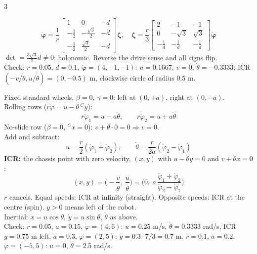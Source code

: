 \begin{multicols}{3}
\begin{fbx}
\[\dot{\boldsymbol\varphi}=\frac1r\begin{bmatrix}1&0&-d\\-\tfrac12&-\tfrac{\sqrt3}2&-d\\-\tfrac12&\tfrac{\sqrt3}2&-d\end{bmatrix}\boldsymbol\zeta,\quad\boldsymbol\zeta=\frac r3\begin{bmatrix}2&-1&-1\\0&-\sqrt3&\sqrt3\\-\tfrac1d&-\tfrac1d&-\tfrac1d\end{bmatrix}\dot{\boldsymbol\varphi}\]
$\det=\tfrac{3\sqrt3}2d\ne0$: holonomic. Reverse the drive sense and all signs flip.\\
Check: $r=0.05$, $d=0.1$, $\dot{\boldsymbol\varphi}=(4,-1,-1)$: $u=0.1667$, $v=0$, $\dot\theta=-0.3333$; ICR $(-v/\dot\theta,u/\dot\theta)=(0,-0.5)$ m, clockwise circle of radius 0.5 m. \chk
\end{fbx}

\begin{fbx}
Fixed standard wheels, $\beta=0$, $\gamma=0$: left at $(0,+a)$, right at $(0,-a)$.\\
Rolling rows ($r\dot\varphi=u-\dot\theta\,{}^Cy$):
\[r\dot\varphi_1=u-a\dot\theta,\qquad r\dot\varphi_2=u+a\dot\theta\]
No-slide row ($\beta=0$, ${}^Cx=0$): $v+\dot\theta\cdot0=0\Rightarrow v=0$.\\
Add and subtract:
\[u=\frac r2(\dot\varphi_1+\dot\varphi_2),\qquad\dot\theta=\frac r{2a}(\dot\varphi_2-\dot\varphi_1)\]
\textbf{ICR:} the chassis point with zero velocity, $(x,y)$ with $u-\dot\theta y=0$ and $v+\dot\theta x=0$:
\[(x,y)=\Big(-\frac v{\dot\theta},\ \frac u{\dot\theta}\Big)=\Big(0,\ a\,\frac{\dot\varphi_1+\dot\varphi_2}{\dot\varphi_2-\dot\varphi_1}\Big)\]
$r$ cancels. Equal speeds: ICR at infinity (straight). Opposite speeds: ICR at the centre (spin). $y>0$ means left of the robot.\\
Inertial: $\dot x=u\cos\theta$, $\dot y=u\sin\theta$, $\dot\theta$ as above.\\
Check: $r=0.05$, $a=0.15$, $\dot\varphi=(4,6)$: $u=0.25$ m/s, $\dot\theta=0.3333$ rad/s, ICR $y=0.75$ m left. $a=0.3$, $\dot\varphi=(2,5)$: $y=0.3\cdot7/3=0.7$ m. $r=0.1$, $a=0.2$, $\dot\varphi=(-5,5)$: $u=0$, $\dot\theta=2.5$ rad/s. \chk
\end{fbx}
\end{multicols}
